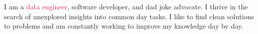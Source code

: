 \documentclass[9pt]{developercv} %
\begin{document}
\vspace{1cm}



\begin{minipage}[t]{1\textwidth} %
	\vspace{-\baselineskip} %

	I am a \textcolor[HTML]{d81e5b}{data engineer}, software developer, and dad joke advocate. I thrive in the search of unexplored insights into common day tasks.
	I like to find clean solutions to problems and am constantly working to improve my knowledge day by day.

\end{minipage}

\vspace{0.5cm}
\end{document}
